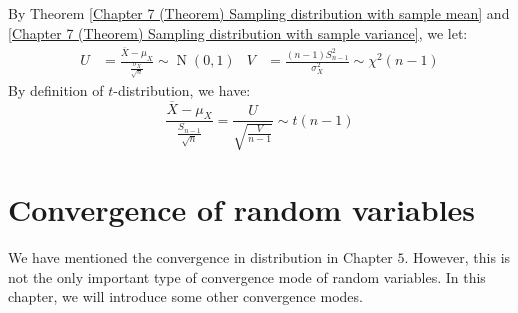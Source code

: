 \documentclass{huhtakm-template-book}
\DeclareMathOperator{\N}{N}
\begin{document}
\begin{proofing}
	By Theorem \ref{Chapter 7 (Theorem) Sampling distribution with sample mean} and \ref{Chapter 7 (Theorem) Sampling distribution with sample variance}, we let:
	\begin{align*}
		U&=\frac{\overline{X}-\mu_{X}}{\frac{\sigma_{X}}{\sqrt{n}}}\sim\N(0,1) & V&=\frac{(n-1)S_{n-1}^{2}}{\sigma_{X}^{2}}\sim\chi^{2}(n-1)
	\end{align*}
	By definition of $t$-distribution, we have:
	\begin{equation*}
		\frac{\overline{X}-\mu_{X}}{\frac{S_{n-1}}{\sqrt{n}}}=\frac{U}{\sqrt{\frac{V}{n-1}}}\sim t(n-1)
	\end{equation*}
\end{proofing}

\chapter{Convergence of random variables}
We have mentioned the convergence in distribution in Chapter $5$. However, this is not the only important type of convergence mode of random variables. In this chapter, we will introduce some other convergence modes.
\end{document}
